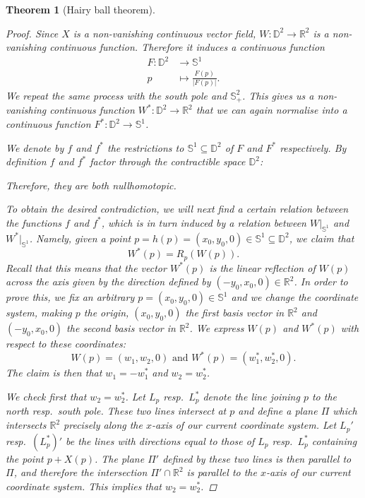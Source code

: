 \documentclass[A4paper, 12pt, british, reqno]{amsart}
\newcommand{\bbD}{\mathbb{D}}
\newcommand{\R}{\mathbb{R}} %
\newcommand{\bbS}{\mathbb{S}}
\theoremstyle{plain}
\newtheorem{thm}{Theorem}[section]
\theoremstyle{definition}
\theoremstyle{remark}
\theoremstyle{plain}
\theoremstyle{definition}
\theoremstyle{remark}
\theoremstyle{plain}
\theoremstyle{definition}
\theoremstyle{remark}
\begin{document}
\begin{thm}[Hairy ball theorem]
\begin{proof}
	Since $X$ is a non-vanishing continuous vector field, $W\colon \bbD^{2}\to \R^{2}$ is a non-vanishing continuous function.
	Therefore it induces a continuous function
	\begin{align*}
	    F\colon \bbD^{2} &\longrightarrow \bbS^{1} \\
	    p &\longmapsto \frac{F(p)}{|F(p)|}.
	\end{align*}
	We repeat the same process with the south pole and $\bbS^{2}_{+}$.
	This gives us a non-vanishing continuous function $W^{*}\colon \bbD^{2}\to \R^{2}$ that we can again normalise into a continuous function $F^{*}\colon \bbD^{2}\to \bbS^{1}$.

	We denote by $f$ and $f^{*}$ the restrictions to $\bbS^{1}\subseteq \bbD^{2}$ of $F$ and $F^{*}$ respectively.
	By definition $f$ and $f^{*}$ factor through the contractible space $\bbD^{2}$:
	\begin{center}
	\end{center}
	Therefore, they are both nullhomotopic.

	To obtain the desired contradiction, we will next find a certain relation between the functions $f$ and $f^{*}$, which is in turn induced by a relation between $W|_{\bbS^{1}}$ and $W^{*}|_{\bbS^{1}}$.
	Namely, given a point $p=h(p)=(x_{0},y_{0},0)\in \bbS^{1}\subseteq \bbD^{2}$, we claim that
	\begin{equation}
	    W^{*}(p)=R_{p}(W(p)).
	\end{equation}
	Recall that this means that the vector $W^{*}(p)$ is the linear reflection of $W(p)$ across the axis given by the direction defined by $(-y_{0},x_{0},0)\in \R^{2}$.
	In order to prove this, we fix an arbitrary $p=(x_{0},y_{0},0)\in \bbS^{1}$ and we change the coordinate system, making $p$ the origin, $(x_{0},y_{0},0)$ the first basis vector in $\R^{2}$ and $(-y_{0},x_{0},0)$ the second basis vector in $\R^{2}$.
	We express $W(p)$ and $W^{*}(p)$ with respect to these coordinates:
	\[ W(p)=(w_{1},w_{2},0) \text{ and } W^{*}(p)=(w_{1}^{*},w_{2}^{*},0). \]
	The claim is then that $w_{1}=-w_{1}^{*}$ and $w_{2}=w_{2}^{*}$.

	We check first that $w_{2}=w_{2}^{*}$.
	Let $L_{p}$ resp.~$L_{p}^{*}$ denote the line joining $p$ to the north resp.~south pole.
	These two lines intersect at $p$ and define a plane $\Pi$ which intersects $\R^{2}$ precisely along the $x$-axis of our current coordinate system.
	Let $L_{p}'$ resp.~$(L_{p}^{*})'$ be the lines with directions equal to those of $L_{p}$ resp.~$L_{p}^{*}$ containing the point $p+X(p)$.
	The plane $\Pi'$ defined by these two lines is then parallel to $\Pi$, and therefore the intersection $\Pi'\cap \R^{2}$ is parallel to the $x$-axis of our current coordinate system.
	This implies that $w_{2}=w_{2}^{*}$.


\end{proof}
\end{thm}
\end{document}

